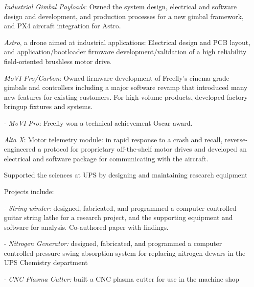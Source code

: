 \documentclass[letterpaper]{deedy-resume} %
\begin{document}
\begin{minipage}[t]{0.66\textwidth}
\begin{tightitemize}
\item \textit{Industrial Gimbal Payloads}: Owned the system design, electrical and software design and development, and production processes for a new gimbal framework, and PX4 aircraft integration for Astro.

\item \textit{Astro}, a drone aimed at industrial applications: Electrical design and PCB layout, and application/bootloader firmware development/validation of a high reliability field-oriented brushless motor drive. 

\item \textit{MoVI Pro/Carbon}: Owned firmware development of Freefly's cinema-grade gimbals and controllers including a major software revamp that introduced many new features for existing customers.  For high-volume products, developed factory bringup fixtures and systems.  

- \textit{MoVI Pro:} Freefly won a technical achievement Oscar award.

\item \textit{Alta X}:  Motor telemetry module: in rapid response to a crash and recall, reverse-engineered a protocol for proprietary off-the-shelf motor drives and developed an electrical and software package for communicating with the aircraft.

\end{tightitemize}
\vspace{\topsep} %

\begin{tightitemize}
\item Supported the sciences at UPS by designing and maintaining research equipment
\item Projects include:

- \textit{String winder:} designed, fabricated, and programmed a computer controlled guitar string lathe for a research project, and the supporting equipment and software for analysis.  Co-authored paper with findings.

- \textit{Nitrogen Generator:} designed, fabricated, and programmed a computer controlled pressure-swing-absorption system for replacing nitrogen dewars in the UPS Chemistry department

- \textit{CNC Plasma Cutter:} built a CNC plasma cutter for use in the machine shop
\end{tightitemize}


\end{minipage}
\end{document}
